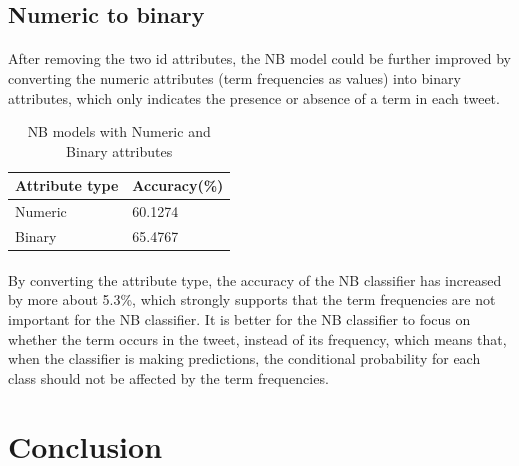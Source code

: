 \documentclass[11pt]{article}
\begin{document}
\subsection{Numeric to binary}

\paragraph{} After removing the two id attributes, the NB model could be further improved by converting the numeric attributes (term frequencies as values) into binary attributes, which only indicates the presence or absence of a term in each tweet.
\begin{table}[!htbp]
 \begin{center}
\begin{tabular}{| l | l |}
      \hline
      Attribute type & Accuracy(\%) \\
      \hline\hline
      Numeric & 60.1274 \\
      Binary & 65.4767 \\
      \hline
\end{tabular}
\caption{NB models with Numeric and Binary attributes}\label{table3}
 \end{center}
\end{table}

\paragraph{} By converting the attribute type, the accuracy of the NB classifier has increased by more about 5.3\%, which strongly supports that the term frequencies are not important for the NB classifier. It is better for the NB classifier to focus on whether the term occurs in the tweet, instead of its frequency, which means that, when the classifier is making predictions, the conditional probability for each class should not be affected by the term frequencies.

\section{Conclusion}
\end{document}
